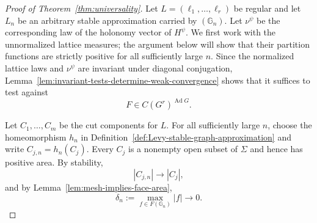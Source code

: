 \documentclass[11pt,a4paper,reqno]{article}
\theoremstyle{definition}
\theoremstyle{remark}
\newcommand\Gbb{{\mathbb{G}}}
\begin{document}
\begin{proof}[Proof of Theorem~\ref{thm:universality}]
Let $L=(\ell_1,\ldots,\ell_r)$ be regular and let $L_n$ be an arbitrary stable approximation carried by $(\Gbb_n)$. Let $\nu^\psi$ be the corresponding law of the holonomy vector of $H^\psi$. We first work with the unnormalized lattice measures; the argument below will show that their partition functions are strictly positive for all sufficiently large $n$. Since the normalized lattice laws and $\nu^\psi$ are invariant under diagonal conjugation, Lemma~\ref{lem:invariant-tests-determine-weak-convergence} shows that it suffices to test against
\[
 F\in C(G^r)^{\operatorname{Ad}G}.
\]

Let $C_1,\ldots,C_m$ be the cut components for $L$. For all
sufficiently large $n$, choose the homeomorphism $h_n$ in
Definition~\ref{def:Levy-stable-graph-approximation} and write
$C_{j,n}=h_n(C_j)$. Every $C_j$ is a nonempty open subset of $\Sigma$ and
hence has positive area. By stability,
\[
 |C_{j,n}|\longrightarrow|C_j|,
\]
and by Lemma~\ref{lem:mesh-implies-face-area},
\[
 \delta_n:=\max_{f\in F(\Gbb_n)}|f|\longrightarrow0.
\]


\end{proof}
\end{document}
